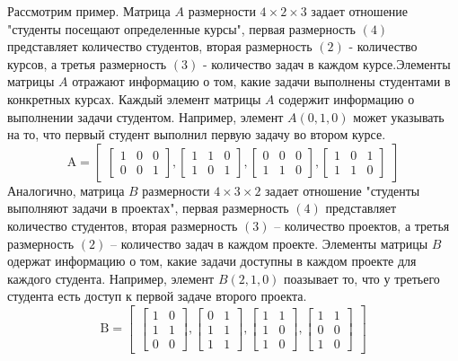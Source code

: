 \documentclass{article}
\begin{document}
Рассмотрим пример. Матрица $A$ размерности $4 \times 2 \times 3$ задает отношение "студенты посещают определенные курсы", первая размерность $(4)$ представляет количество студентов, вторая размерность $(2)$ - количество курсов, а третья размерность $(3)$ - количество задач в каждом курсе.Элементы матрицы $A$ отражают информацию о том, какие задачи выполнены студентами в конкретных курсах. Каждый элемент матрицы $A$ содержит информацию о выполнении задачи студентом. Например, элемент $A(0, 1, 0)$ может указывать на то, что первый студент выполнил первую задачу во втором курсе.
\[
\text{A} = \begin{bmatrix}
    \begin{bmatrix}
      1 & 0 & 0 \\
      0 & 0 & 1 
      \end{bmatrix},
     
    \begin{bmatrix}
      1 & 1 & 0 \\
      1 & 0 & 1 
    \end{bmatrix},
    \begin{bmatrix}
      0 & 0 & 0 \\
      1 & 1 & 0 
    \end{bmatrix},
     
    \begin{bmatrix}
      1 & 0 & 1 \\
      1 & 1 & 0 
    \end{bmatrix}
\end{bmatrix}
\] 
Аналогично, матрица $B$ размерности $4 \times 3 \times 2$ задает отношение "студенты выполняют задачи в проектах", первая размерность $(4)$ представляет количество студентов, вторая размерность $(3)$ -- количество проектов, а третья размерность $(2)$ -- количество задач в каждом проекте. Элементы матрицы $B$ одержат информацию о том, какие задачи доступны в каждом проекте для каждого студента. Например, элемент $B(2, 1, 0)$ поазывает то, что у третьего студента есть доступ к первой задаче второго проекта.
\[
\text{B} = \begin{bmatrix}
    \begin{bmatrix}
      1 & 0 \\
      1 & 1 \\
      0 & 0 
    \end{bmatrix} , 

    \begin{bmatrix}  
      0 & 1 \\
      1 & 1 \\
      1 & 1
    \end{bmatrix},
    \begin{bmatrix} 
      1 & 1 \\
      1 & 0 \\
      1 & 0
    \end{bmatrix},
    
    \begin{bmatrix} 
      1 & 1 \\
      0 & 0 \\
      1 & 0 
    \end{bmatrix}
\end{bmatrix}
\] 
\end{document}
